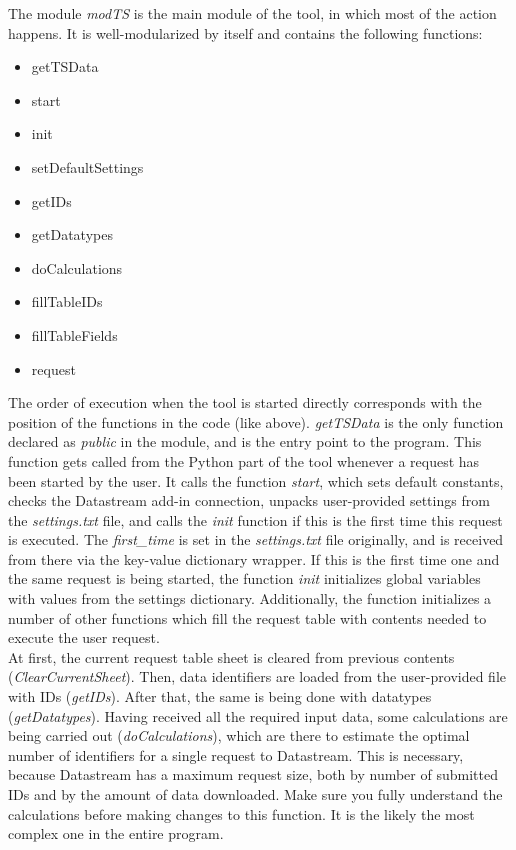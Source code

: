 The module \textit{modTS} is the main module of the tool, in which most of the action happens. It is well-modularized by itself and contains the following functions: 
\begin{itemize}
	\item getTSData
	\item start
	\item init
	\item setDefaultSettings
	\item getIDs
	\item getDatatypes
	\item doCalculations
	\item fillTableIDs
	\item fillTableFields
	\item request
\end{itemize}
The order of execution when the tool is started directly corresponds with the position of the functions in the code (like above). \textit{getTSData} is the only function declared as \textit{public} in the module, and is the entry point to the program. This function gets called from the Python part of the tool whenever a request has been started by the user. It calls the function \textit{start}, which sets default constants, checks the Datastream add-in connection, unpacks user-provided settings from the \textit{settings.txt} file, and calls the \textit{init} function if this is the first time this request is executed. The \textit{first\_time} is set in the \textit{settings.txt} file originally, and is received from there via the key-value dictionary wrapper. If this is the first time one and the same request is being started, the function \textit{init} initializes global variables with values from the settings dictionary. Additionally, the function initializes a number of other functions which fill the request table with contents needed to execute the user request. \\

At first, the current request table sheet is cleared from previous contents (\textit{ClearCurrentSheet}). Then, data identifiers are loaded from the user-provided file with IDs (\textit{getIDs}). After that, the same is being done with datatypes (\textit{getDatatypes}). Having received all the required input data, some calculations are being carried out (\textit{doCalculations}), which are there to estimate the optimal number of identifiers for a single request to Datastream. This is necessary, because Datastream has a maximum request size, both by number of submitted IDs and by the amount of data downloaded. Make sure you fully understand the calculations before making changes to this function. It is the likely the most complex one in the entire program. \\

